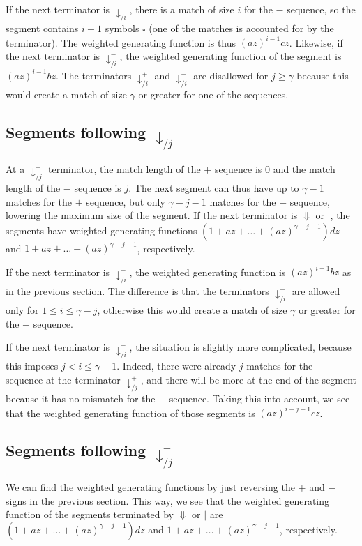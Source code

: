 \documentclass{article}
\begin{document}
If the next terminator is $\downarrow_{/i}^+$, there is a match of size
$i$ for the $-$ sequence, so the segment contains $i-1$ symbols
$\square$ (one of the matches is accounted for by the terminator). The
weighted generating function is thus $(az)^{i-1}cz$. Likewise, if the next
terminator is $\downarrow_{/i}^-$, the weighted generating function of the
segment is $(az)^{i-1}bz$. The terminators $\downarrow_{/i}^+$ and
$\downarrow_{/i}^-$ are disallowed for $j \geq \gamma$ because this would
create a match of size $\gamma$ or greater for one of the sequences.

\subsection{Segments following $\downarrow_{/j}^+$}

At a $\downarrow_{/j}^+$ terminator, the match length of the $+$ sequence
is 0 and the match length of the $-$ sequence is $j$. The next segment can
thus have up to $\gamma-1$ matches for the $+$ sequence, but only
$\gamma-j-1$ matches for the $-$ sequence, lowering the maximum size of
the segment. If the next terminator is $\Downarrow$ or $|$, the segments
have weighted generating functions $(1 + az + \ldots +
(az)^{\gamma-j-1})dz$ and $1 + az + \ldots + (az)^{\gamma-j-1}$,
respectively.

If the next terminator is $\downarrow_{/i}^-$, the weighted generating
function is $(az)^{i-1}bz$ as in the previous section. The difference is
that the terminators $\downarrow_{/i}^-$ are allowed only for $1 \leq i
\leq \gamma-j$, otherwise this would create a match of size $\gamma$ or
greater for the $-$ sequence.

If the next terminator is $\downarrow_{/i}^+$, the situation is slightly
more complicated, because this imposes $j < i \leq \gamma-1$. Indeed,
there were already $j$ matches for the $-$ sequence at the terminator
$\downarrow_{/j}^+$, and there will be more at the end of the segment
because it has no mismatch for the $-$ sequence. Taking this into account,
we see that the weighted generating function of those segments is
$(az)^{i-j-1}cz$.

\subsection{Segments following $\downarrow_{/j}^-$}

We can find the weighted generating functions by just reversing the $+$
and $-$ signs in the previous section. This way, we see that the weighted
generating function of the segments terminated by $\Downarrow$ or $|$ are
$(1 + az + \ldots + (az)^{\gamma-j-1})dz$ and $1 + az + \ldots +
(az)^{\gamma-j-1}$, respectively.
\end{document}
